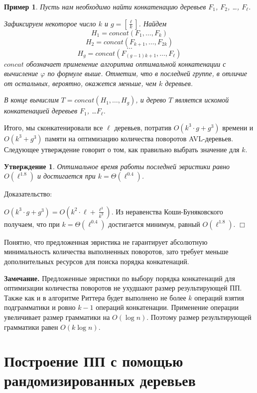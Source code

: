 \documentclass[14pt]{article}
\newtheorem{example}{Пример}[section]
\newtheorem{claim}{Утверждение}[section]
\begin{document}
\begin{example}
	Пусть нам необходимо найти конкатенацию деревьев $F_1$, $F_2$, \ldots, $F_{\ell}$.
	
	Зафиксируем некоторое число $k$ и $g = \left[\frac{\ell}{k}\right]$. Найдем 
	\[ H_1 = concat(F_1, \ldots, F_k) \]
	\[ H_2 = concat(F_{k+1}, \ldots, F_{2k}) \]
	\[ \ldots \]
	\[ H_g = concat(F_{(g-1)k+1}, \ldots, F_{\ell}) \]
	$concat$ обозначает применение алгоритма оптимальной конкатенации с вычисление $\varphi$ по формуле выше.
	Отметим, что в последней группе, в отличие от остальных, вероятно, окажется меньше, чем $k$ деревьев.

	В конце вычислим $T = concat(H_1, \ldots, H_g)$, и дерево $T$ является 
	искомой конкатенацией деревьев $F_1$, \ldots $F_{\ell}$.
\end{example}

Итого, мы сконкатенировали все $\ell$ деревьев, потратив $O(k^3 \cdot g + g^3)$ времени и $O(k^3 + g^3)$ памяти
на оптимизацию количества поворотов AVL-деревьев. Следующее утверждение говорит о том, как правильно выбрать значение для $k$.

\begin{claim}
	Оптимальное время работы последней эвристики равно $O(\ell^{1.8})$ и достигается при $k=\Theta(\ell^{0.4})$.
\end{claim}

{\sc Доказательство:}

$O(k^3 \cdot g + g^3) = O(k^2 \cdot \ell + \frac{\ell^3}{k^3})$. Из неравенства Коши-Буняковского получаем, что
при $k=\Theta(\ell^{0.4})$ достигается минимум, равный $O(\ell^{1.8})$. $\Box$

Понятно, что предложенная эвристика не гарантирует абсолютную минимальность количества выполненных поворотов, зато
требует меньше дополнительных ресурсов для поиска порядка конкатенаций.

{\bf Замечание.} Предложенные эвристики по выбору порядка конкатенаций для оптимизации количества поворотов
не ухудшают размер результирующей ПП. Также как и в алгоритме Риттера будет выполнено не более $k$ операций взятия подграмматики
и ровно $k-1$ операций конкатенации. Применение операции увеличивает размер грамматики на $O(\log n)$. Поэтому размер
результирующей грамматики равен $O(k\log n)$.

\section{Построение ПП с помощью рандомизированных деревьев}
\end{document}
